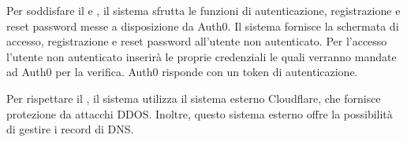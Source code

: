 \begin{listaPersonale}[DCO]{}
    Per soddisfare il  e , il sistema sfrutta le funzioni di autenticazione, registrazione e reset password messe a disposizione da Auth0. Il sistema fornisce la schermata di accesso, registrazione e reset password all'utente non autenticato. Per l'accesso l'utente non autenticato inserirà le proprie credenziali le quali verranno mandate ad Auth0 per la verifica. Auth0 risponde con un token di autenticazione.

    Per rispettare il , il sistema utilizza il sistema esterno Cloudflare, che fornisce protezione da attacchi DDOS. Inoltre, questo sistema esterno offre la possibilità di gestire i record di DNS.


\end{listaPersonale}
